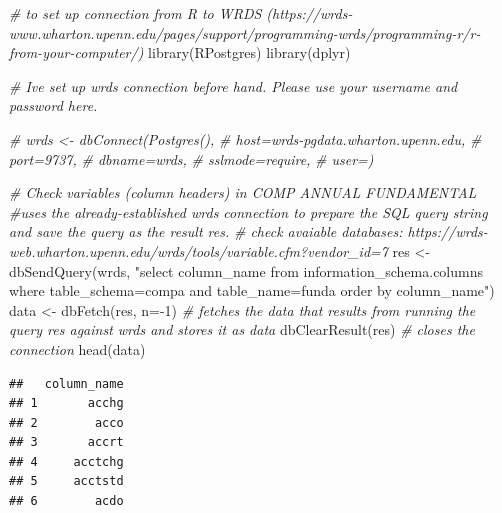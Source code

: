 \documentclass[
]{book}
\newenvironment{Shaded}{\begin{snugshade}}{\end{snugshade}}
\newcommand{\AttributeTok}[1]{\textcolor[rgb]{0.77,0.63,0.00}{#1}}
\newcommand{\CommentTok}[1]{\textcolor[rgb]{0.56,0.35,0.01}{\textit{#1}}}
\newcommand{\DecValTok}[1]{\textcolor[rgb]{0.00,0.00,0.81}{#1}}
\newcommand{\FunctionTok}[1]{\textcolor[rgb]{0.00,0.00,0.00}{#1}}
\newcommand{\NormalTok}[1]{#1}
\newcommand{\OtherTok}[1]{\textcolor[rgb]{0.56,0.35,0.01}{#1}}
\newcommand{\SpecialCharTok}[1]{\textcolor[rgb]{0.00,0.00,0.00}{#1}}
\newcommand{\StringTok}[1]{\textcolor[rgb]{0.31,0.60,0.02}{#1}}
\begin{document}
\begin{Shaded}
\begin{Highlighting}[]
\CommentTok{\# to set up connection from R to WRDS (https://wrds{-}www.wharton.upenn.edu/pages/support/programming{-}wrds/programming{-}r/r{-}from{-}your{-}computer/)}
\FunctionTok{library}\NormalTok{(RPostgres)}
\FunctionTok{library}\NormalTok{(dplyr)}

\CommentTok{\# I\textquotesingle{}ve set up wrds connection before hand. Please use your username and password here.}

\CommentTok{\# wrds \textless{}{-} dbConnect(Postgres(),}
\CommentTok{\#                   host=\textquotesingle{}wrds{-}pgdata.wharton.upenn.edu\textquotesingle{},}
\CommentTok{\#                   port=9737,}
\CommentTok{\#                   dbname=\textquotesingle{}wrds\textquotesingle{},}
\CommentTok{\#                   sslmode=\textquotesingle{}require\textquotesingle{},}
\CommentTok{\#                   user=\textquotesingle{}\textquotesingle{})}

\CommentTok{\# Check variables (column headers) in COMP ANNUAL FUNDAMENTAL}
\CommentTok{\#uses the already{-}established wrds connection to prepare the SQL query string and save the query as the result res.}
\CommentTok{\# check avaiable databases: https://wrds{-}web.wharton.upenn.edu/wrds/tools/variable.cfm?vendor\_id=7}
\NormalTok{res }\OtherTok{\textless{}{-}} \FunctionTok{dbSendQuery}\NormalTok{(wrds, }\StringTok{"select column\_name}
\StringTok{                   from information\_schema.columns}
\StringTok{                   where table\_schema=\textquotesingle{}compa\textquotesingle{}}
\StringTok{                   and table\_name=\textquotesingle{}funda\textquotesingle{}}
\StringTok{                   order by column\_name"}\NormalTok{)}
\NormalTok{data }\OtherTok{\textless{}{-}} \FunctionTok{dbFetch}\NormalTok{(res, }\AttributeTok{n=}\SpecialCharTok{{-}}\DecValTok{1}\NormalTok{) }\CommentTok{\# fetches the data that results from running the query res against wrds and stores it as data}
\FunctionTok{dbClearResult}\NormalTok{(res) }\CommentTok{\# closes the connection}
\FunctionTok{head}\NormalTok{(data)}
\end{Highlighting}
\end{Shaded}

\begin{verbatim}
##   column_name
## 1       acchg
## 2        acco
## 3       accrt
## 4     acctchg
## 5     acctstd
## 6        acdo
\end{verbatim}
\end{document}
